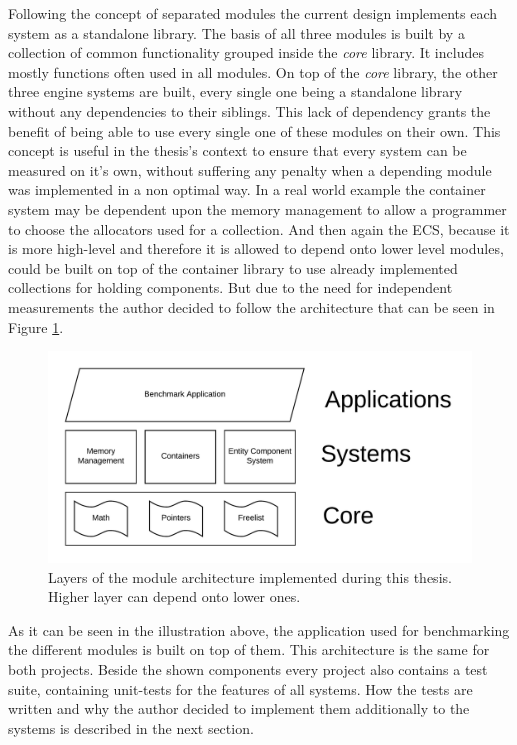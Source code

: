 Following the concept of separated modules the current design implements each system as a standalone library. The basis of all three modules is built by a collection of common functionality grouped inside the \textit{core} library. It includes mostly functions often used in all modules. On top of the \textit{core} library, the other three engine systems are built, every single one being a standalone library without any dependencies to their siblings. This lack of dependency grants the benefit of being able to use every single one of these modules on their own. This concept is useful in the thesis's context to ensure that every system can be measured on it's own, without suffering any penalty when a depending module was implemented in a non optimal way. In a real world example the container system may be dependent upon the memory management to allow a programmer to choose the allocators used for a collection. And then again the \ac{ECS}, because it is more high-level and therefore it is allowed to depend onto lower level modules, could be built on top of the container library to use already implemented collections for holding components. But due to the need for independent measurements the author decided to follow the architecture that can be seen in Figure \ref{fig:spark_arch}.

\begin{figure}[h!]
	\centering \includegraphics[width=\linewidth]{PICs/spark_arch.png}
	\caption{Layers of the module architecture implemented during this thesis. Higher layer can depend onto lower ones.}
	\label{fig:spark_arch}
\end{figure}

As it can be seen in the illustration above, the application used for benchmarking the different modules is built on top of them. This architecture is the same for both projects. Beside the shown components every project also contains a test suite, containing unit-tests for the features of all systems. How the tests are written and why the author decided to implement them additionally to the systems is described in the next section.

